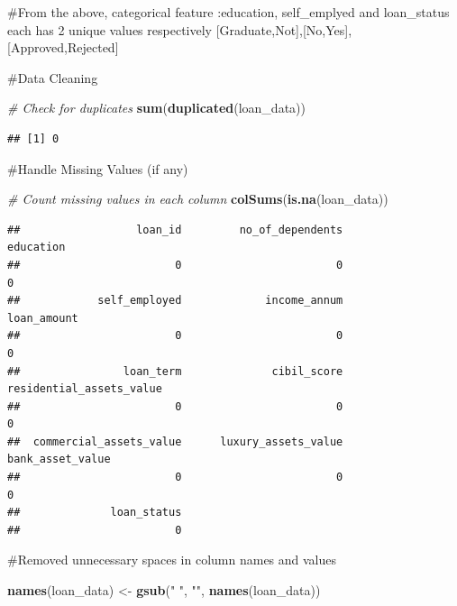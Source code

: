 \documentclass[
]{article}
\newenvironment{Shaded}{\begin{snugshade}}{\end{snugshade}}
\newcommand{\CommentTok}[1]{\textcolor[rgb]{0.56,0.35,0.01}{\textit{#1}}}
\newcommand{\FunctionTok}[1]{\textcolor[rgb]{0.13,0.29,0.53}{\textbf{#1}}}
\newcommand{\NormalTok}[1]{#1}
\newcommand{\OtherTok}[1]{\textcolor[rgb]{0.56,0.35,0.01}{#1}}
\newcommand{\StringTok}[1]{\textcolor[rgb]{0.31,0.60,0.02}{#1}}
\begin{document}
\#From the above, categorical feature :education, self\_emplyed and
loan\_status each has 2 unique values respectively
{[}Graduate,Not{]},{[}No,Yes{]},{[}Approved,Rejected{]}

\#Data Cleaning

\begin{Shaded}
\begin{Highlighting}[]
\CommentTok{\# Check for duplicates}
\FunctionTok{sum}\NormalTok{(}\FunctionTok{duplicated}\NormalTok{(loan\_data))}
\end{Highlighting}
\end{Shaded}

\begin{verbatim}
## [1] 0
\end{verbatim}

\#Handle Missing Values (if any)

\begin{Shaded}
\begin{Highlighting}[]
\CommentTok{\# Count missing values in each column}
\FunctionTok{colSums}\NormalTok{(}\FunctionTok{is.na}\NormalTok{(loan\_data))}
\end{Highlighting}
\end{Shaded}

\begin{verbatim}
##                  loan_id         no_of_dependents                education 
##                        0                        0                        0 
##            self_employed             income_annum              loan_amount 
##                        0                        0                        0 
##                loan_term              cibil_score residential_assets_value 
##                        0                        0                        0 
##  commercial_assets_value      luxury_assets_value         bank_asset_value 
##                        0                        0                        0 
##              loan_status 
##                        0
\end{verbatim}

\#Removed unnecessary spaces in column names and values

\begin{Shaded}
\begin{Highlighting}[]
\FunctionTok{names}\NormalTok{(loan\_data) }\OtherTok{\textless{}{-}} \FunctionTok{gsub}\NormalTok{(}\StringTok{" "}\NormalTok{, }\StringTok{""}\NormalTok{, }\FunctionTok{names}\NormalTok{(loan\_data))}
\end{Highlighting}
\end{Shaded}
\end{document}

